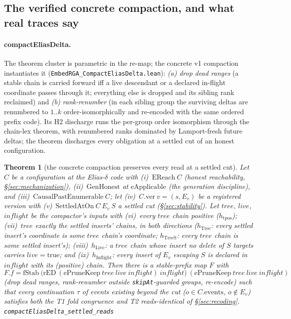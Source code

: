 \documentclass[11pt]{article}
\newtheorem{theorem}{Theorem}[section]
\newcommand{\lean}[1]{\texttt{#1}}
\newcommand{\code}[1]{\texttt{#1}}
\begin{document}
\subsection{The verified concrete compaction, and what real traces say}
\label{sec:compactED}

\paragraph{compactEliasDelta.} The theorem cluster is parametric in the
re-map; the concrete v1 compaction instantiates it
(\code{EmbedRGA\_CompactEliasDelta.lean}): \emph{(a) drop dead ranges}
(a stable chain is carried forward iff a live descendant or a declared
in-flight coordinate passes through it; everything else is dropped and
its sibling rank reclaimed) and \emph{(b) rank-renumber} (in each
sibling group the surviving deltas are renumbered to $1..k$
order-isomorphically and re-encoded with the same ordered prefix code).
Its H2 discharge runs the per-group order isomorphism through the
chain-lex theorem, with renumbered ranks dominated by Lamport-fresh
future deltas; the theorem discharges every obligation at a settled cut of
an honest configuration.

\begin{theorem}[the concrete compaction preserves every read at a
settled cut]
\label{thm:compacted}
Let $C$ be a configuration at the Elias-$\delta$ code with
(i)~$\mathrm{EReach}\ C$ (honest reachability,
\S\ref{sec:mechanization}), (ii)~$\mathrm{GenHonest}$ at
$\mathrm{eApplicable}$ (the generation discipline), and
(iii)~$\mathrm{CausalPastEnumerable}\ C$; let (iv)~$C.\mathrm{ver}\ v
= (s, E_v)$ be a registered version with
(v)~$\mathrm{SettledAtOn}\ C\ E_v\ S$ a settled cut
(\S\ref{sec:stability}). Let $\mathit{tree}$, $\mathit{live}$,
$\mathit{inflight}$ be the compactor's inputs with
(vi)~every $\mathit{tree}$ chain positive ($h_{\mathrm{tpos}}$);
(vii)~$\mathit{tree}$ exactly the settled inserts' chains, in both
directions ($h_{\mathrm{Tree}}$: every settled insert's coordinate is
some $\mathit{tree}$ chain's coordinate; $h_{\mathrm{TreeS}}$: every
$\mathit{tree}$ chain is some settled insert's);
(viii)~$h_{\mathrm{Live}}$: a $\mathit{tree}$ chain whose insert no
delete of $S$ targets carries $\mathit{live} = \mathrm{true}$; and
(ix)~$h_{\mathrm{Inflight}}$: every insert of $E_v$ escaping $S$ is
declared in $\mathit{inflight}$ with its (positive) chain. Then there
is a stable-prefix map $F$ with
\[
  F.f = \mathrm{fStab}\ \bigl(\mathrm{rED}\ (\mathrm{ePruneKeep}\
  \mathit{tree}\ \mathit{live}\ \mathit{inflight})\
  \mathit{inflight}\bigr)\ (\mathrm{ePruneKeep}\ \mathit{tree}\
  \mathit{live}\ \mathit{inflight})
\]
(drop dead ranges, rank-renumber outside \lean{skipAt}-guarded groups,
re-encode) such that every continuation $\tau$ of events existing
beyond the cut ($o \in C.\mathrm{events}$, $o \notin E_v$) satisfies
both the T1 fold congruence and T2 reads-identical of
\S\ref{sec:recoding}.
\hfill\lean{compactEliasDelta\_settled\_reads}
\end{theorem}
\end{document}
